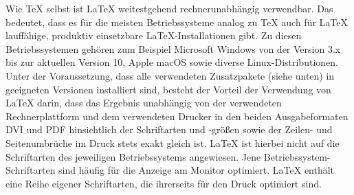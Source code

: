\documentclass[12pt, a4paper]{article}
\begin{document}
Wie TeX selbst ist LaTeX weitestgehend rechnerunabhängig verwendbar. Das bedeutet, dass es für die meisten Betriebssysteme analog zu TeX auch für LaTeX lauffähige, produktiv einsetzbare LaTeX-Installationen gibt. Zu diesen Betriebssystemen gehören zum Beispiel Microsoft Windows von der Version 3.x bis zur aktuellen Version 10, Apple macOS sowie diverse Linux-Distributionen. Unter der Voraussetzung, dass alle verwendeten Zusatzpakete (siehe unten) in geeigneten Versionen installiert sind, besteht der Vorteil der Verwendung von LaTeX darin, dass das Ergebnis unabhängig von der verwendeten Rechnerplattform und dem verwendeten Drucker in den beiden Ausgabeformaten DVI und PDF hinsichtlich der Schriftarten und -größen sowie der Zeilen- und Seitenumbrüche im Druck stets exakt gleich ist. LaTeX ist hierbei nicht auf die Schriftarten des jeweiligen Betriebssystems angewiesen. Jene Betriebssystem-Schriftarten sind häufig für die Anzeige am Monitor optimiert. LaTeX enthält eine Reihe eigener Schriftarten, die ihrerseits für den Druck optimiert sind. 
\end{document}
